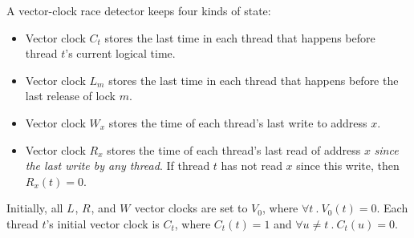 \documentclass[preprint, 10pt]{sigplanconf}
\newcommand{\Tid}{t}
\newcommand{\TidU}{u}
\newcommand{\Address}{x}
\newcommand{\Lock}{m}
\newcommand{\VC}{V}
\newcommand{\VCFont}{}
\newcommand{\ThreadVC}[1]{\VCFont{C}_{#1}}
\newcommand{\LockVC}[1]{\VCFont{L}_{#1}}
\newcommand{\ReadVC}[1]{\VCFont{R}_{#1}}
\newcommand{\WriteVC}[1]{\VCFont{W}_{#1}}
\newcommand{\Bind}{\ .\ }
\begin{document}
A vector-clock race detector keeps
four kinds of state:
\begin{itemize}
\item
 Vector clock $\ThreadVC{\Tid}$ stores the last time in each thread that happens before thread $\Tid$'s current logical time.
\item
 Vector clock $\LockVC{\Lock}$ stores the last time in each thread that happens before the last release of lock $\Lock$.  
\item
 Vector clock $\WriteVC{\Address}$ stores
  the time of each thread's last write to address $\Address$.
\item
 Vector clock $\ReadVC{\Address}$ stores
  the time of each thread's last read of address $\Address$ \emph{since the last write
    by any thread}.  If thread $t$ has not read $\Address$ since this write,
  then $\ReadVC{\Address}(\Tid) = 0$.
\end{itemize}

Initially, all $\LockVC{}$, $\ReadVC{}$, and $\WriteVC{}$ vector clocks are
set to $\VC_0$, where $\forall \Tid \Bind \VC_0(\Tid) = 0$.  Each thread $\Tid$'s
initial vector clock is $\ThreadVC{\Tid}$, where $\ThreadVC{\Tid}(\Tid) = 1$
and $\forall \TidU \neq \Tid \Bind \ThreadVC{\Tid}(\TidU) = 0$.  
\end{document}

